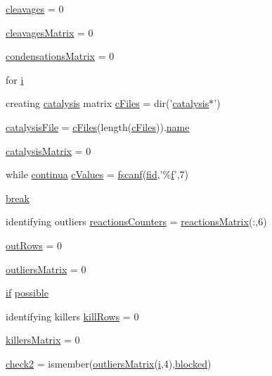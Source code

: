 \begin{DoxyCompactItemize}
\item 
\hyperlink{a00029_a89060c6979e5a4ff7b0985b35f295695}{cleavages} = 0
\item 
\hyperlink{a00029_a1a691fb4f955887edfa538e91479fafe}{cleavages\-Matrix} = 0
\item 
\hyperlink{a00029_afaba8eef2f8f4e4dda2e893a19e55a94}{condensations\-Matrix} = 0
\item 
for \hyperlink{a00029_ac870e1cd47f6d78f16a98a24c8392fcf}{i}
\item 
creating \hyperlink{a00012}{catalysis} matrix \hyperlink{a00029_a9eab57ccb42a39c704f47dc30e4f4515}{c\-Files} = dir('\hyperlink{a00012}{catalysis}$\ast$')
\item 
\hyperlink{a00029_a33e70cf5b45cb59005b82d30202f0b69}{catalysis\-File} = \hyperlink{a00030_a9eab57ccb42a39c704f47dc30e4f4515}{c\-Files}(length(\hyperlink{a00030_a9eab57ccb42a39c704f47dc30e4f4515}{c\-Files})).\hyperlink{a00027_abbf559a76fab59203496b0847ab9502a}{name}
\item 
\hyperlink{a00029_a0810027f58d6be965e44b7b84c44ace8}{catalysis\-Matrix} = 0
\item 
while \hyperlink{a00030_a9c951ebd5bc3f1adce943bee1255f4d6}{continua} \hyperlink{a00029_ad4ba7701967c1da20171228afccb7081}{c\-Values} = \hyperlink{a00025_a028ac102a731e62fb0a7439381f566c1}{fscanf}(\hyperlink{a00031_ae9011d40c6f13e68e6f07156e0da7c5d}{fid},'\%\hyperlink{a00025_a9c5a71c46b1abb8b7df5ebeac6c81535}{f}',7)
\item 
\hyperlink{a00029_a91cf6fbebedd86150a36e5ac3d5d3bfc}{break}
\item 
identifying outliers \hyperlink{a00029_aeea253cb98a56047ef20ceed86e2f0ea}{reactions\-Counters} = \hyperlink{a00030_af998036b749d9fa6dd2365f9937279b6}{reactions\-Matrix}(\-:,6)
\item 
\hyperlink{a00029_a60cfb1ca20cbbc81b85a8f56658b7c99}{out\-Rows} = 0
\item 
\hyperlink{a00029_ad8a18b407726bf44299c9bcf5d1389ff}{outliers\-Matrix} = 0
\item 
\hyperlink{a00030_a01d55766b8058903dd360b4bda71f9f5}{if} \hyperlink{a00029_a07c9e68cdbafe572c04d3112d64deb88}{possible}
\item 
identifying killers \hyperlink{a00029_a747bc1d10158c78e88e314825ed41a13}{kill\-Rows} = 0
\item 
\hyperlink{a00029_a929016802e1ede2217a41240a6974fa6}{killers\-Matrix} = 0
\item 
\hyperlink{a00029_a98a8838a85ed24032563a44271b1525a}{check2} = ismember(\hyperlink{a00030_a9733b61dd859b1133aa3aa849cf70cbc}{outliers\-Matrix}(\hyperlink{a00071_ad3efca1ea6e3333daf30719ee0501862}{i},4),\hyperlink{a00030_a1faaaae288fc8ca4ed1751049aa2f84f}{blocked})

\end{DoxyCompactItemize}
